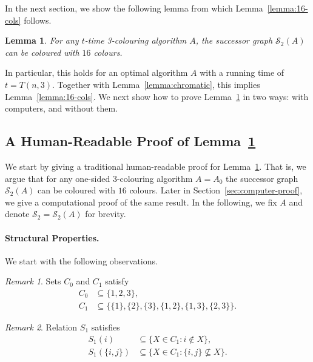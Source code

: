 \documentclass[a4paper,11pt]{article}
\newtheorem{lemma}[theorem]{Lemma}
\theoremstyle{remark}
\newtheorem{remark}{Remark}
\newcommand{\cS}{\mathcal{S}}
\begin{document}
In the next section, we show the following lemma from which Lemma~\ref{lemma:16-cols} follows.

\begin{lemma} \label{lemma:s2-16-cols}
 For any $t$-time 3-colouring algorithm $A$, the successor graph $\cS_2(A)$ can be coloured with $16$ colours.
\end{lemma}
In particular, this holds for an optimal algorithm $A$ with a running time of $t = T(n,3)$. Together with Lemma~\ref{lemma:chromatic}, this implies Lemma~\ref{lemma:16-cols}. We next show how to prove Lemma~\ref{lemma:s2-16-cols} in two ways: with computers, and without them.

\subsection{A Human-Readable Proof of Lemma~\ref{lemma:s2-16-cols}}

We start by giving a traditional human-readable proof for Lemma~\ref{lemma:s2-16-cols}. That is, we argue that for any one-sided 3-colouring algorithm $A=A_0$ the successor graph $\cS_2(A)$ can be coloured with $16$ colours. Later in Section~\ref{sec:computer-proof}, we give a computational proof of the same result. In the following, we fix $A$ and denote $\cS_2 = \cS_2(A)$ for brevity. 

\paragraph{Structural Properties.} 

We start with the following observations.
\begin{remark}\label{remark:colors}
Sets $C_0$ and $C_1$ satisfy
\begin{align*}
    C_0 &\subseteq \{1,2,3\}, \\
    C_1 &\subseteq \bigl\{\{1\},\{2\},\{3\},\{1,2\},\{1,3\},\{2,3\}\bigr\}.
\end{align*}
\end{remark}

\begin{remark}\label{remark:successors}
Relation $S_1$ satisfies
\begin{align*}
    S_1(i) &\subseteq \big\{ X \in C_1 : i \notin X \big\}, \\
    S_1(\{i,j\}) &\subseteq \big\{ X \in C_1 : \{i,j\} \nsubseteq X \big\}.
\end{align*}
\end{remark}
\end{document}
